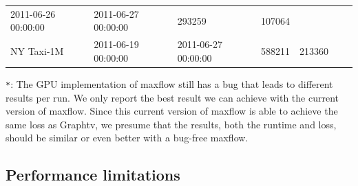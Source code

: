\documentclass[10pt,oneside]{memoir}
\begin{document}
\begin{longtable}[]{@{}lllllll@{}}
\begin{minipage}[t]{0.15\columnwidth}
2011-06-26 00:00:00\strut
\end{minipage} & \begin{minipage}[t]{0.14\columnwidth}\raggedright
2011-06-27 00:00:00\strut
\end{minipage} & \begin{minipage}[t]{0.07\columnwidth}\raggedright
293259\strut
\end{minipage} & \begin{minipage}[t]{0.07\columnwidth}\raggedright
107064\strut
\end{minipage} & \begin{minipage}[t]{0.14\columnwidth}\raggedright
\strut
\end{minipage} & \begin{minipage}[t]{0.14\columnwidth}\raggedright
\strut
\end{minipage}\tabularnewline
\begin{minipage}[t]{0.10\columnwidth}\raggedright
NY Taxi-1M\strut
\end{minipage} & \begin{minipage}[t]{0.15\columnwidth}\raggedright
2011-06-19 00:00:00\strut
\end{minipage} & \begin{minipage}[t]{0.14\columnwidth}\raggedright
2011-06-27 00:00:00\strut
\end{minipage} & \begin{minipage}[t]{0.07\columnwidth}\raggedright
588211\strut
\end{minipage} & \begin{minipage}[t]{0.07\columnwidth}\raggedright
213360\strut
\end{minipage} & \begin{minipage}[t]{0.14\columnwidth}\raggedright
\strut
\end{minipage} & \begin{minipage}[t]{0.14\columnwidth}\raggedright
\strut
\end{minipage}\tabularnewline
\bottomrule
\end{longtable}

\texttt{*}: The GPU implementation of maxflow still has a bug that leads
to different results per run. We only report the best result we can
achieve with the current version of maxflow. Since this current version
of maxflow is able to achieve the same loss as Graphtv, we presume that
the results, both the runtime and loss, should be similar or even better
with a bug-free maxflow.

\hypertarget{performance-limitations-7}{%
\subsection{Performance limitations}\label{performance-limitations-7}}
\end{document}
